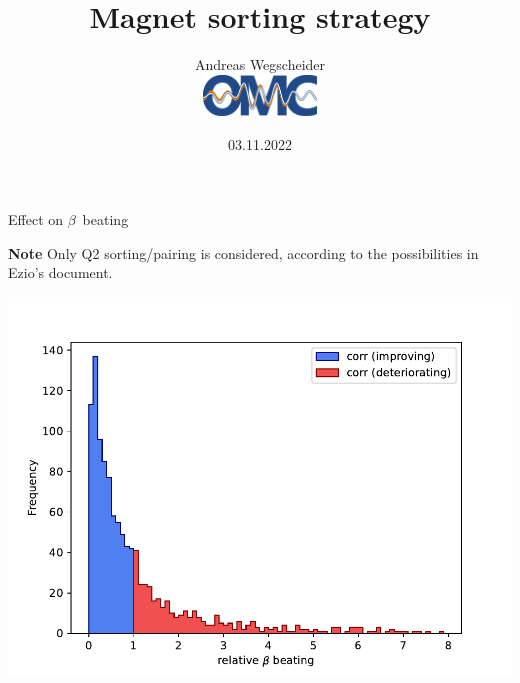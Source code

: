 \documentclass[usenames,dvipsnames,aspectratio=169,table]{beamer}
\author[awegsche]{%
Andreas Wegscheider\\[1em]
\centering%
\includegraphics[width=3cm]{OMC_logo_original.pdf}%
}
\title[Magnet sorting]{Magnet sorting strategy}
\institute{CERN}
\date[03.11.22]{03.11.2022}
\begin{document}
\begin{frame}
    \titlepage
\end{frame}





\begin{frame} %
    {Effect on $\beta$~beating}


    \textbf{Note} Only Q2 sorting/pairing is considered, according to the possibilities in Ezio's document.
    
    
    \includegraphics[width=0.45\linewidth]{corr_onlyQ2.pdf}


\end{frame} %


\end{document}
